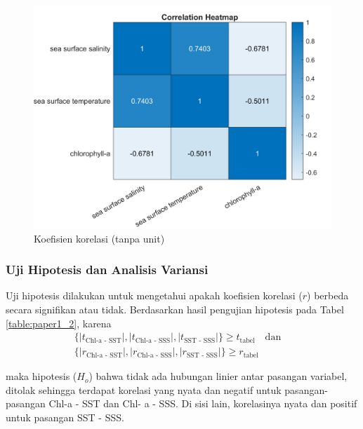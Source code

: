 \begin{spacing}{1.5}
	\begin{figure}[H]
		\centering
		\includegraphics[width=15cm]{contents/final_figure_paper1/gambar_3}
		\caption{Koefisien korelasi (tanpa unit)}
		\label{fig:paper1_3}
	\end{figure}

\subsubsection[Uji Hipotesis dan Analisis Variansi]{Uji Hipotesis dan Analisis Variansi}
	
	Uji hipotesis dilakukan untuk mengetahui apakah koefisien korelasi ($r$) berbeda secara signifikan atau tidak. Berdasarkan hasil pengujian hipotesis pada Tabel \ref{table:paper1_2}, karena 
	\begin{equation*}
		\begin{aligned}
			\{|t_{\text{Chl-a - SST}}|,|t_{\text{Chl-a - SSS}}|,|t_{\text{SST - SSS}}|\}\geq t_{\text{tabel}} \quad \text{dan} \quad \\
			\{|r_{\text{Chl-a - SST}}|,|r_{\text{Chl-a - SSS}}|,|r_{\text{SST - SSS}}|\}\geq r_{\text{tabel}} 	
		\end{aligned}	
	\end{equation*} 
	
	maka hipotesis ($H_o$) bahwa tidak ada hubungan linier antar pasangan variabel, ditolak sehingga terdapat korelasi yang nyata dan negatif untuk pasangan-pasangan Chl-a - SST dan Chl- a - SSS. Di sisi lain, korelasinya nyata dan positif untuk pasangan SST - SSS.
	

\end{spacing}
